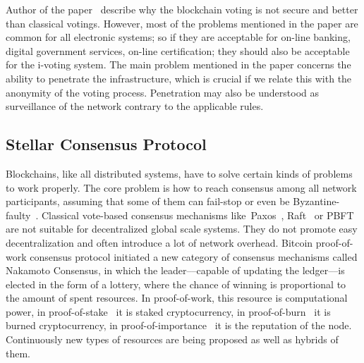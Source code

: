 \documentclass[applsci,article,accept,moreauthors,pdftex]{Definitions/mdpi}
\begin{document}
Author of the paper~\cite{jeffersonmyth} describe why the blockchain voting is not secure and better than classical votings. However, most of the problems mentioned in the paper are common for all electronic systems; so if they are acceptable for on-line banking, digital government services, on-line certification; they should also be acceptable for the i-voting system. The main problem mentioned in the paper concerns the ability to penetrate the infrastructure, which is crucial if we relate this with the anonymity of the voting process. Penetration may also be understood as surveillance of the network contrary to the applicable rules. 




\subsection{Stellar Consensus Protocol}
Blockchains, like all distributed systems, have to solve certain kinds of problems to work properly. The core problem is how to reach consensus among all network participants, assuming that some of them can fail-stop or even be Byzantine-faulty~\cite{lamport2019byzantine}. Classical vote-based consensus mechanisms like~Paxos~\cite{lamport2019part,lamport2001paxos}, Raft~\cite{ongaro2014search} or PBFT~\cite{castro1999practical} are not suitable for decentralized global scale systems. They do not promote easy decentralization and often introduce a lot of network overhead. Bitcoin proof-of-work consensus protocol initiated a new category of consensus mechanisms called Nakamoto Consensus, in which the leader––capable of updating the ledger––is elected in the form of a lottery, where the chance of winning is proportional to the amount of spent resources. In proof-of-work, this resource is computational power, in proof-of-stake~\cite{king2012ppcoin} it is staked cryptocurrency, in proof-of-burn~\cite{whitepap24:online} it is burned cryptocurrency, in proof-of-importance~\cite{NEMtechR25:online} it is the reputation of the node. Continuously new types of resources are being proposed as well as hybrids of them. 
\end{document}
